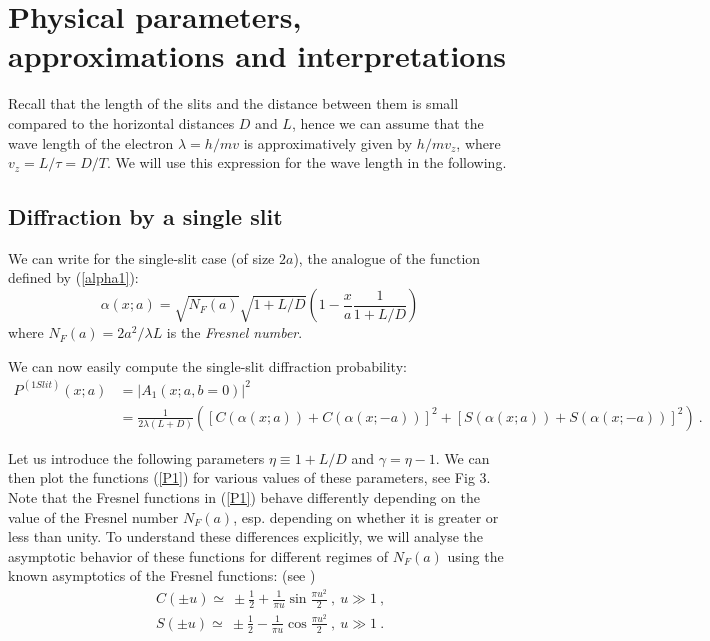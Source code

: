 \documentclass[12pt,aps,prb,preprint]{revtex4-1}   %
\begin{document}
\section{Physical parameters, approximations and interpretations}

Recall that the length of the slits and the distance between them
is small compared to the horizontal distances $D$ and $L$, hence we can
assume that the wave length of the electron $\lambda=h/mv$ 
is approximatively given by $h/mv_z$, where $v_z=L/\tau=D/T$. 
We will use this expression for the wave length in the following.

\subsection{Diffraction by a single slit}

We can write for the single-slit case (of size $2a$), the
analogue of the function defined by (\ref{alpha1}):
\begin{equation}\label{alpha}
\alpha(x;a)=\sqrt{N_F(a)}\sqrt{1+L/D}
\left(1-\frac{x}{a}\frac{1}{1+L/D}\right)
\end{equation}
where $N_F(a)=2a^2/\lambda L$ is the \textit{Fresnel number}.

We can now easily compute the single-slit diffraction
probability:
\begin{align}\label{P1}
P^{(1Slit)}(x;a) &= |A_1(x;a,b=0)|^2
{}\nonumber\\{}&=\frac{1}{2\lambda(L+D)} \left([C(\alpha(x;a)) +
C(\alpha(x;-a))]^2 + [S(\alpha(x;a)) + S(\alpha(x;-a))]^2 \right)\ .
\end{align}

Let us introduce the following parameters $\eta\equiv 1+L/D$ and
$\gamma=\eta-1$. We can then plot the functions (\ref{P1}) for
various values of these parameters, see Fig 3. Note that the
Fresnel functions in (\ref{P1}) behave differently depending on
the value of the Fresnel number $N_F(a)$, esp. depending on
whether it is greater or less than unity. To understand these
differences explicitly, we will analyse the asymptotic behavior
of these functions for different regimes of $N_F(a)$ using the
known asymptotics of the Fresnel functions: (see \cite{Abramowitz})
\begin{eqnarray}\label{ApproxCS}
&& C(\pm u)\simeq\ \pm\frac{1}{2}+\frac{1}{\pi u}\sin{\frac{\pi
u^2}{2}}\ ,\ u\gg1\ , {}\nonumber\\{}&& S(\pm u)\simeq\
\pm\frac{1}{2}-\frac{1}{\pi u}\cos{\frac{\pi u^2}{2}}\ ,\ u\gg1\ .
\end{eqnarray}
\end{document}
